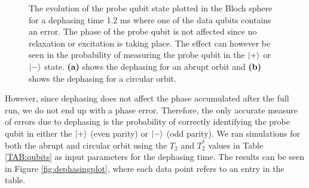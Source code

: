 \begin{figure}[H]
	\caption[oddeven]{The evolution of the probe qubit state plotted in the Bloch sphere for a dephasing time 1.2 ms where one of the data qubits contains an error. The phase of the probe qubit is not affected since no relaxation or excitation is taking place. The effect can however be seen in the probability of measuring the probe qubit in the $\ket{+}$ or $\ket{-}$ state. \textbf{(a)} shows the dephasing for an abrupt orbit and \textbf{(b)} shows the dephasing for a circular orbit.}
	\label{FIG:deph}
\end{figure}


However, since dephasing does not affect the phase accumulated after the full run, we do not end up with a phase error. Therefore, the only accurate measure of errors due to dephasing is the probability of correctly identifying the probe qubit in either the $\ket{+}$ (even parity) or $\ket{-}$ (odd parity). We ran simulations for both the abrupt and circular orbit using the $T_2$ and $T_2^*$ values in Table \ref{TAB:qubits} as input parameters for the dephasing time. The results can be seen in Figure \ref{fig:dephasingplot}, where each data point refers to an entry in the table. 

